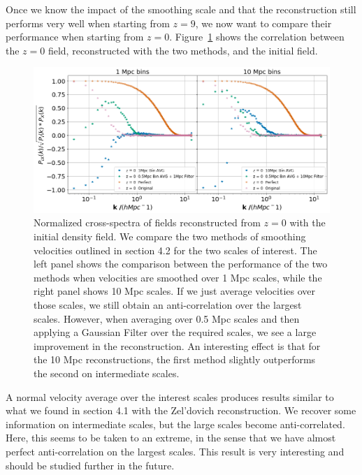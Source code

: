 Once we know the impact of the smoothing scale and that the reconstruction still performs very well when starting from $z=9$, we now want to compare their performance when starting from $z=0$. Figure~\ref{fig:4.3} shows the correlation between the $z=0$ field, reconstructed with the two methods, and the initial field. 

\begin{figure}
    \centering
    \includegraphics[width=1\columnwidth]{images/realRecon/filterComp.png}%
    
    \caption{
        Normalized cross-spectra of fields reconstructed from $z=0$ with the initial density field. We compare the two methods of smoothing velocities outlined in section 4.2 for the two scales of interest. The left panel shows the comparison between the performance of the two methods when velocities are smoothed over 1 Mpc scales, while the right panel shows 10 Mpc scales. If we just average velocities over those scales, we still obtain an anti-correlation over the largest scales. However, when averaging over 0.5 Mpc scales and then applying a Gaussian Filter over the required scales, we see a large improvement in the reconstruction. An interesting effect is that for the 10 Mpc reconstructions, the first method slightly outperforms the second on intermediate scales. 
    }
    
    \label{fig:4.3}
\end{figure}

A normal velocity average over the interest scales produces results similar to what we found in section 4.1 with the Zel'dovich reconstruction. We recover some information on intermediate scales, but the large scales become anti-correlated. Here, this seems to be taken to an extreme, in the sense that we have almost perfect anti-correlation on the largest scales. This result is very interesting and should be studied further in the future.


